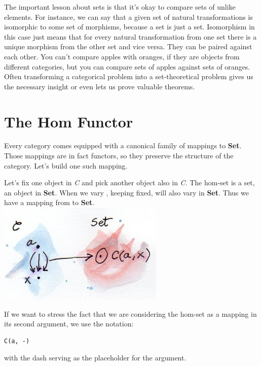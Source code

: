 The important lesson about sets is that it's okay to compare sets of
unlike elements. For instance, we can say that a given set of natural
transformations is isomorphic to some set of morphisms, because a set is
just a set. Isomorphism in this case just means that for every natural
transformation from one set there is a unique morphism from the other
set and vice versa. They can be paired against each other. You can't
compare apples with oranges, if they are objects from different
categories, but you can compare sets of apples against sets of oranges.
Often transforming a categorical problem into a set-theoretical problem
gives us the necessary insight or even lets us prove valuable theorems.

\section{The Hom Functor}\label{the-hom-functor}

Every category comes equipped with a canonical family of mappings to
\textbf{Set}. Those mappings are in fact functors, so they preserve the
structure of the category. Let's build one such mapping.

Let's fix one object  in \emph{C} and pick another object
 also in \emph{C}. The hom-set  is a set, an
object in \textbf{Set}. When we vary , keeping 
fixed,  will also vary in \textbf{Set}. Thus we have a
mapping from  to \textbf{Set}.\\
\includegraphics[width=3.12500in]{images/hom-set.jpg}

If we want to stress the fact that we are considering the hom-set as a
mapping in its second argument, we use the notation:

\begin{Verbatim}[commandchars=\\\{\}]
C(a, -)
\end{Verbatim}

with the dash serving as the placeholder for the argument.

